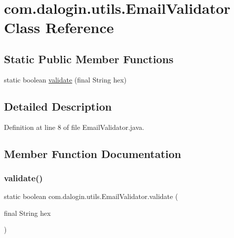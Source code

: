 \hypertarget{classcom_1_1dalogin_1_1utils_1_1_email_validator}{}\section{com.\+dalogin.\+utils.\+Email\+Validator Class Reference}
\label{classcom_1_1dalogin_1_1utils_1_1_email_validator}
\subsection*{Static Public Member Functions}
\begin{DoxyCompactItemize}
\item 
static boolean \hyperlink{classcom_1_1dalogin_1_1utils_1_1_email_validator_abeddfefc4274d669443c65b47ded0161}{validate} (final String hex)
\end{DoxyCompactItemize}


\subsection{Detailed Description}


Definition at line 8 of file Email\+Validator.\+java.



\subsection{Member Function Documentation}
\mbox{\label{classcom_1_1dalogin_1_1utils_1_1_email_validator_abeddfefc4274d669443c65b47ded0161}} 
\subsubsection{\texorpdfstring{validate()}{validate()}}
{\footnotesize\ttfamily static boolean com.\+dalogin.\+utils.\+Email\+Validator.\+validate (\begin{DoxyParamCaption}\item[{final String}]{hex }\end{DoxyParamCaption})\hspace{0.3cm}{\ttfamily [static]}}

